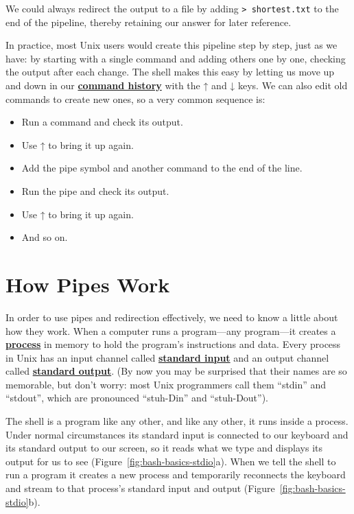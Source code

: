 \documentclass[
]{krantz}
\providecommand{\tightlist}{%
  \setlength{\itemsep}{0pt}\setlength{\parskip}{0pt}}
\newcommand{\gref}[2]{\hyperlink{#2}{\textbf{#1}}}
\begin{document}
We could always redirect the output to a file
by adding \texttt{\textgreater{}\ shortest.txt} to the end of the pipeline,
thereby retaining our answer for later reference.

In practice,
most Unix users would create this pipeline step by step,
just as we have:
by starting with a single command and adding others one by one,
checking the output after each change.
The shell makes this easy
by letting us move up and down in our \gref{command history}{command\_history}
with the ↑ and ↓ keys.
We can also edit old commands to create new ones,
so a very common sequence is:

\begin{itemize}
\tightlist
\item
  Run a command and check its output.
\item
  Use ↑ to bring it up again.
\item
  Add the pipe symbol \texttt{\textbar{}} and another command to the end of the line.
\item
  Run the pipe and check its output.
\item
  Use ↑ to bring it up again.
\item
  And so on.
\end{itemize}

\hypertarget{bash-basics-stdio}{%
\section{How Pipes Work}\label{bash-basics-stdio}}

In order to use pipes and redirection effectively,
we need to know a little about how they work.
When a computer runs a program---any program---it creates a \gref{process}{process} in memory
to hold the program's instructions and data.
Every process in Unix has an input channel called \gref{standard input}{stdin}
and an output channel called \gref{standard output}{stdout}.
(By now you may be surprised that their names are so memorable,
but don't worry:
most Unix programmers call them ``stdin'' and ``stdout'',
which are pronounced ``stuh-Din'' and ``stuh-Dout'').

The shell is a program like any other,
and like any other,
it runs inside a process.
Under normal circumstances its standard input is connected to our keyboard
and its standard output to our screen,
so it reads what we type
and displays its output for us to see (Figure~\ref{fig:bash-basics-stdio}a).
When we tell the shell to run a program
it creates a new process
and temporarily reconnects the keyboard and stream
to that process's standard input and output (Figure~\ref{fig:bash-basics-stdio}b).
\end{document}
